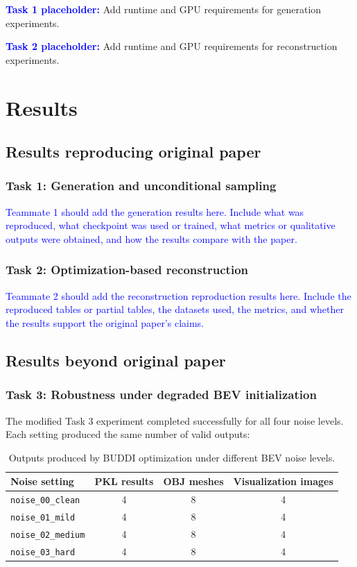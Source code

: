 \documentclass[10pt]{article}
\begin{document}
\textcolor{blue}{\textbf{Task 1 placeholder:}} Add runtime and GPU requirements for generation experiments.

\textcolor{blue}{\textbf{Task 2 placeholder:}} Add runtime and GPU requirements for reconstruction experiments.

\section{Results}
\label{sec:results}

\subsection{Results reproducing original paper}

\subsubsection{Task 1: Generation and unconditional sampling}

\textcolor{blue}{Teammate 1 should add the generation results here. Include what was reproduced, what checkpoint was used or trained, what metrics or qualitative outputs were obtained, and how the results compare with the paper.}

\subsubsection{Task 2: Optimization-based reconstruction}

\textcolor{blue}{Teammate 2 should add the reconstruction reproduction results here. Include the reproduced tables or partial tables, the datasets used, the metrics, and whether the results support the original paper's claims.}

\subsection{Results beyond original paper}

\subsubsection{Task 3: Robustness under degraded BEV initialization}

The modified Task 3 experiment completed successfully for all four noise levels. Each setting produced the same number of valid outputs:

\begin{table}[H]
\centering
\begin{tabular}{lccc}
\toprule
Noise setting & PKL results & OBJ meshes & Visualization images \\
\midrule
\texttt{noise\_00\_clean} & 4 & 8 & 4 \\
\texttt{noise\_01\_mild} & 4 & 8 & 4 \\
\texttt{noise\_02\_medium} & 4 & 8 & 4 \\
\texttt{noise\_03\_hard} & 4 & 8 & 4 \\
\bottomrule
\end{tabular}
\caption{Outputs produced by BUDDI optimization under different BEV noise levels.}
\label{tab:task3_outputs}
\end{table}
\end{document}
